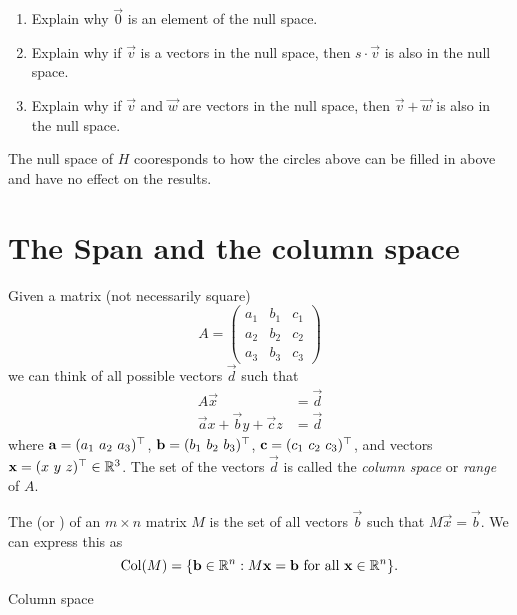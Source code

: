 \documentclass{ximera}
\begin{document}
\begin{example}
\begin{enumerate}
    \item Explain why $\vec{0}$ is an element of the null space.
    \item Explain why if $\vec{v}$ is a vectors in the null space, then $s\cdot
            \vec{v}$ is also in the null space.
    \item Explain why if $\vec{v}$ and $\vec{w}$ are vectors in the null space,
          then $\vec{v} + \vec{w}$ is also in the null space.
  \end{enumerate}
  \begin{explanation}
    The null space of $H$ cooresponds to how the circles above can be filled in
    above and have no effect on the results.
  \end{explanation}
\end{example}

\section{The Span and the column space}

Given a matrix (not necessarily square)
\[
  A = \begin{pmatrix}
    a_1 & b_1 & c_1 \\
    a_2 & b_2 & c_2 \\
    a_3 & b_3 & c_3
  \end{pmatrix}
\]
we can think of all possible vectors $\vec{d}$ such that
\begin{align*}
  A\vec{x}                          & = \vec{d} \\
  \vec{a} x + \vec{b} y + \vec{c} z & = \vec{d}
\end{align*}
where $\mathbf{a} = (a_1~a_2~a_3)^\top$, $\mathbf{b} =
  (b_1~b_2~b_3)^\top$, $\mathbf{c} = (c_1~c_2~c_3)^\top$, and vectors
$\mathbf{x} = (x~y~z)^\top\in\mathbb{R}^3$.
The set of the vectors $\vec{d}$ is called the \textit{column space} or \textit{range} of $A$.


\begin{definition}
  The  (or ) of an $m \times n$ matrix $M$ is
  the set of all vectors $\vec{b}$ such that $M\vec{x} = \vec{b}$. We can express
  this as
  \[
    \operatorname{Col}(M) = \{ \mathbf{b}\in\mathbb{R}^n: M\mathbf{x} = \mathbf{b}\text{~for all~}\mathbf{x}\in\mathbb{R}^n\}.
  \]
\end{definition}


\begin{example}
  Column space
\end{example}
\end{document}
